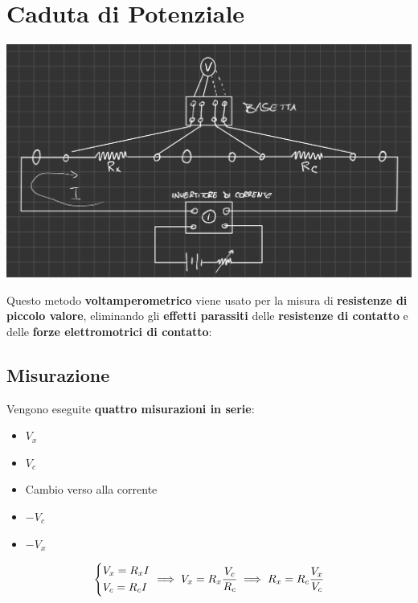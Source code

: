 \chapter{Caduta di Potenziale}
\begin{center}
    \includegraphics[width=.6\textwidth]{Images/figure43.png}
\end{center}
Questo metodo \textbf{voltamperometrico} viene usato per la misura di \textbf{resistenze di piccolo valore}, eliminando gli \textbf{effetti parassiti} delle \textbf{resistenze di contatto} e delle \textbf{forze elettromotrici di contatto}:
\section{Misurazione}
Vengono eseguite \textbf{quattro misurazioni in serie}:
\begin{itemize}
    \item $V_x$
    \item $V_c$
    \item Cambio verso alla corrente
    \item $-V_c$
    \item $-V_x$
\end{itemize}
\begin{equation*}
    \begin{dcases}
        V_x = R_x I\\
        V_c = R_c I
    \end{dcases}
    \implies V_x = R_x \frac{V_c}{R_c} \implies R_x = R_c \frac{V_x}{V_c}
\end{equation*}
